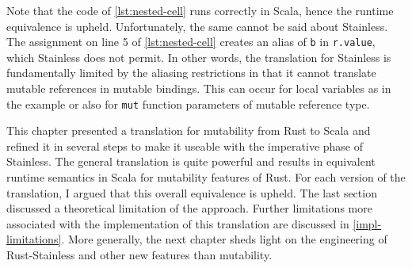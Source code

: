 Note that the code of \autoref{lst:nested-cell} runs correctly in Scala, hence
the runtime equivalence is upheld. Unfortunately, the same cannot be said about
Stainless. The assignment on line 5 of \autoref{lst:nested-cell} creates an
alias of \lstinline!b! in \lstinline!r.value!, which Stainless does not permit.
In other words, the translation for Stainless is fundamentally limited by the
aliasing restrictions in that it cannot translate mutable references in mutable
bindings. This can occur for local variables as in the example or also for
\lstinline!mut! function parameters of mutable reference type.

\hfill \break \noindent This chapter presented a translation for mutability from
Rust to Scala and refined it in several steps to make it useable with the
imperative phase of Stainless. The general translation is quite powerful and
results in equivalent runtime semantics in Scala for mutability features of
Rust. For each version of the translation, I argued that this overall
equivalence is upheld. The last section discussed a theoretical limitation of
the approach. Further limitations more associated with the implementation of
this translation are discussed in \autoref{impl-limitations}. More generally,
the next chapter sheds light on the engineering of Rust-Stainless and other new
features than mutability.
